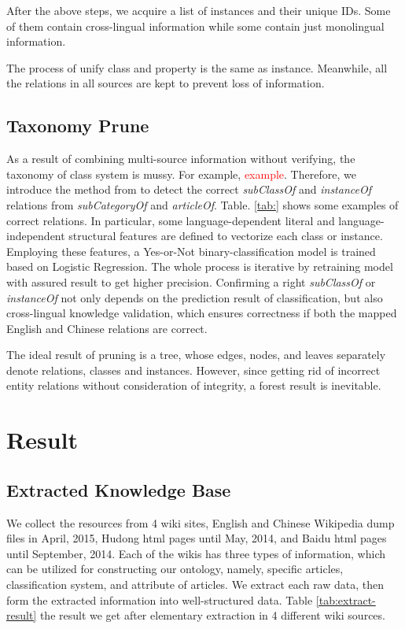 \documentclass[runningheads,a4paper]{llncs}
\begin{document}
After the above steps, we acquire a list of instances and their unique IDs. Some of them contain cross-lingual information while some contain just monolingual information.

The process of unify class and property is the same as instance. Meanwhile, all the relations in all sources are kept to prevent loss of information.

\subsection{Taxonomy Prune}
\label{sec:tp}

As a result of combining multi-source information without verifying, the taxonomy of class system is mussy. For example, \textcolor{red}{example}. Therefore, we introduce the method from\cite{wang2014cross} to detect the correct \textit{subClassOf} and \textit{instanceOf} relations from \textit{subCategoryOf} and \textit{articleOf}. Table. \ref{tab:} shows some examples of correct relations. In particular, some language-dependent literal and language-independent structural features are defined to vectorize each class or instance. Employing these features, a Yes-or-Not binary-classification model is trained based on Logistic Regression. The whole process is iterative by retraining model with assured result to get higher precision. Confirming a right \textit{subClassOf} or \textit{instanceOf} not only depends on the prediction result of classification, but also cross-lingual knowledge validation, which ensures correctness if both the mapped English and Chinese relations are correct.

The ideal result of pruning is a tree, whose edges, nodes, and leaves separately denote relations, classes and instances. However, since getting rid of incorrect entity relations without consideration of integrity, a forest result is inevitable.

\section{Result}
\label{sec:result}

\subsection{Extracted Knowledge Base}
We collect the resources from 4 wiki sites, English and Chinese Wikipedia dump files in April, 2015, Hudong html pages until May, 2014, and Baidu html pages until September, 2014. Each of the wikis has three types of information, which can be utilized for constructing our ontology, namely, specific articles, classification system, and attribute of articles. We extract each raw data, then form the extracted information into well-structured data. Table \ref{tab:extract-result} the result we get after elementary extraction in 4 different wiki sources.
\end{document}
